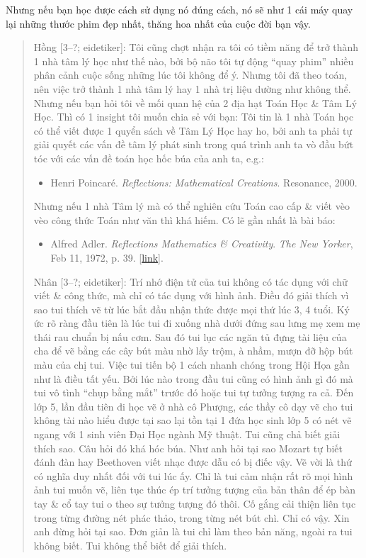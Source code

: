 \documentclass[12pt,twoside]{book}
\begin{document}
Nhưng nếu bạn học được cách sử dụng nó đúng cách, nó sẽ như 1 cái máy quay lại những thước phim đẹp nhất, thăng hoa nhất của cuộc đời bạn vậy.
\begin{quote}
	{\sf Hồng [3--?; eidetiker]}: Tôi cũng chợt nhận ra tôi có tiềm năng để trở thành 1 nhà tâm lý học như thế nào, bởi bộ não tôi tự động ``quay phim'' nhiều phân cảnh cuộc sống những lúc tôi không để ý. Nhưng tôi đã theo toán, nên việc trở thành 1 nhà tâm lý hay 1 nhà trị liệu dường như không thể. Nhưng nếu bạn hỏi tôi về mối quan hệ của 2 địa hạt Toán Học \& Tâm Lý Học. Thì có 1 insight tôi muốn chia sẻ với bạn: Tôi tin là 1 nhà Toán học có thể viết được 1 quyển sách về Tâm Lý Học hay ho, bởi anh ta phải tự giải quyết các vấn đề tâm lý phát sinh trong quá trình anh ta vò đầu bứt tóc với các vấn đề toán học hốc búa của anh ta, e.g.:
	\begin{itemize}
		\item {\sc Henri Poincar\'e}. {\it Reflections: Mathematical Creations}. Resonance, 2000.
	\end{itemize}
	Nhưng nếu 1 nhà Tâm lý mà có thể nghiên cứu Toán cao cấp \& viết vèo vèo công thức Toán như văn thì khá hiếm. Có lẽ gần nhất là bài báo:
	\begin{itemize}
		\item {\sc Alfred Adler}. {\it Reflections Mathematics \& Creativity}. {\it The New Yorker}, Feb 11, 1972, p. 39. [\href{https://www.newyorker.com/magazine/1972/02/19/reflections-mathematics-and-creativity}{link}].
	\end{itemize}
	{\sf Nhân [3--?; eidetiker]}: Trí nhớ điện tử của tui không có tác dụng với chữ viết \& công thức, mà chỉ có tác dụng với hình ảnh. Điều đó giải thích vì sao tui thích vẽ từ lúc bắt đầu nhận thức được mọi thứ lúc 3, 4 tuổi. Ký ức rõ ràng đầu tiên là lúc tui đi xuống nhà dưới đứng sau lưng mẹ xem mẹ thái rau chuẩn bị nấu cơm. Sau đó tui lục các ngăn tủ đựng tài liệu của cha để vẽ bằng các cây bút màu nhờ lấy trộm, à nhầm, mượn đỡ hộp bút màu của chị tui. Việc tui tiến bộ 1 cách nhanh chóng trong Hội Họa gần như là điều tất yếu. Bởi lúc nào trong đầu tui cũng có hình ảnh gì đó mà tui vô tình ``chụp bằng mắt'' trước đó hoặc tui tự tưởng tượng ra cả. Đến lớp 5, lần đầu tiên đi học vẽ ở nhà cô Phượng, các thầy cô dạy vẽ cho tui không tài nào hiểu được tại sao lại tồn tại 1 đứa học sinh lớp 5 có nét vẽ ngang với 1 sinh viên Đại Học ngành Mỹ thuật. Tui cũng chả biết giải thích sao. Câu hỏi đó khá hóc búa. Như anh hỏi tại sao {\sc Mozart} tự biết đánh đàn hay {\sc Beethoven} viết nhạc được dẫu có bị điếc vậy. Vẽ vời là thứ có nghĩa duy nhất đối với tui lúc ấy. Chỉ là tui cảm nhận rất rõ mọi hình ảnh tui muốn vẽ, liên tục thúc ép trí tưởng tượng của bản thân để ép bàn tay \& cổ tay tui o theo sự tưởng tượng đó thôi. Cố gắng cải thiện liên tục trong từng đường nét phác thảo, trong từng nét bút chì. Chỉ có vậy. Xin anh đừng hỏi tại sao. Đơn giản là tui chỉ làm theo bản năng, ngoài ra tui không biết. Tui không thể biết để giải thích.
	

\end{quote}
\end{document}
